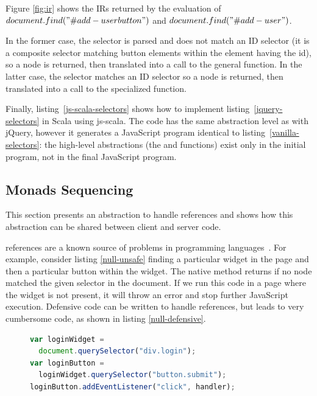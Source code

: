 \documentclass[preprint]{sigplanconf}
\begin{document}
\vspace{1 cm}

Figure \ref{fig:ir} shows the IRs returned by the evaluation of \small{
$document\\.find("\#add-user button")$} \normalsize{and}  \small{$ document.find("\#add-user")$}.

\normalsize{}

\sloppy
In the former case, the selector is parsed and does not match an ID selector (it is a composite
selector matching button elements within the element having the  id), so a
 node is returned, then translated into a call to the general
 function. In the latter case, the selector matches an ID selector so a
 node is returned, then translated into a call to the specialized
 function.

Finally, listing~\ref{js-scala-selectors} shows how to implement listing~\ref{jquery-selectors} in
Scala using js-scala. The code has the same abstraction level as with jQuery, however it
generates a JavaScript program identical to listing~\ref{vanilla-selectors}: the high-level
abstractions (the  and  functions) exist only in the initial program, not
in the final JavaScript program.

\subsection{Monads Sequencing}
\label{sec:option}

This section presents an abstraction to handle  references and shows how this
abstraction can be shared between client and server code.

 references are a known source of problems in programming
languages~\cite{Hoare09_Null,Nanda09_Null}. For example, consider listing \ref{null-unsafe} finding
a particular widget in the page and then a particular button within the widget. The native
 method returns  if no node matched the given selector in the
document. If we run this code in a page where the widget is not present, it will throw an error
and stop further JavaScript execution. Defensive code can be written to handle 
references, but leads to very cumbersome code, as shown in listing \ref{null-defensive}.

\begin{figure}[htb]
\begin{lstlisting}[language=JavaScript,label=null-unsafe,caption=Unsafe code]
var loginWidget =
  document.querySelector("div.login");
var loginButton =
  loginWidget.querySelector("button.submit");
loginButton.addEventListener("click", handler);
\end{lstlisting}
\end{figure}
\end{document}
